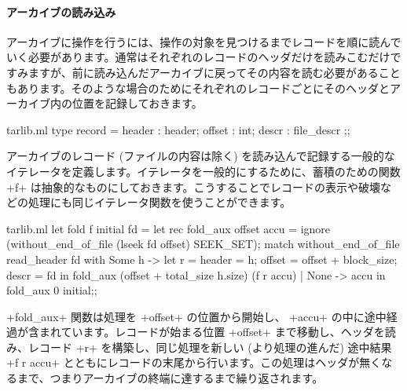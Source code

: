\paragraph{アーカイブの読み込み}
アーカイブに操作を行うには、操作の対象を見つけるまでレコードを順に読んでいく必要があります。通常はそれぞれのレコードのヘッダだけを読みこむだけですみますが、前に読み込んだアーカイブに戻ってその内容を読む必要があることもあります。そのような場合のためにそれぞれのレコードごとにそのヘッダとアーカイブ内の位置を記録しておきます。
%
\begin{listingcodefile}{tarlib.ml}
type record = { header : header; offset : int; descr : file_descr };;
\end{listingcodefile}
%
アーカイブのレコード (ファイルの内容は除く) を読み込んで記録する一般的なイテレータを定義します。イテレータを一般的にするために、蓄積のための関数 \ml+f+ は抽象的なものにしておきます。こうすることでレコードの表示や破壊などの処理にも同じイテレータ関数を使うことができます。
%
\begin{listingcodefile}{tarlib.ml}
let fold f initial fd  =
  let rec fold_aux offset accu =
    ignore (without_end_of_file (lseek fd offset) SEEK_SET);
    match without_end_of_file read_header fd with
      Some h ->
        let r =
          { header = h; offset = offset + block_size; descr = fd } in
        fold_aux (offset + total_size h.size) (f r accu)
    | None -> accu in
  fold_aux 0 initial;;
\end{listingcodefile}
%
\ml+fold_aux+ 関数は処理を \ml+offset+ の位置から開始し、 \ml+accu+ の中に途中経過が含まれています。レコードが始まる位置 \ml+offset+ まで移動し、ヘッダを読み、レコード \ml+r+ を構築し、同じ処理を新しい (より処理の進んだ) 途中結果 \ml+f r accu+ とともにレコードの末尾から行います。この処理はヘッダが無くなるまで、つまりアーカイブの終端に達するまで繰り返されます。


